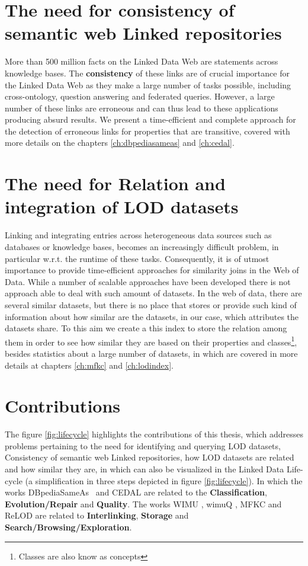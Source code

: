 \section{The need for consistency of semantic web Linked repositories}
More than 500 million facts on the Linked Data Web are statements across knowledge bases. The \textbf{consistency} of these links are of crucial importance for the Linked Data Web as they make a large number of tasks possible, including  cross-ontology, question answering and federated queries. However, a large number of these links are erroneous and can thus lead to these applications producing absurd results. We present a time-efficient and complete approach for the detection of erroneous links for properties that are transitive\cite{valdestilhasdbpediasameas, valdestilhas2017cedal}, covered with more details on the chapters \ref{ch:dbpediasameas} and \ref{ch:cedal}.

\section{The need for Relation and integration of LOD datasets}
Linking and integrating entries across heterogeneous data sources such as databases or knowledge bases, becomes an increasingly difficult problem, in particular w.r.t. the runtime of these tasks. Consequently, it is of utmost importance to provide time-efficient approaches for similarity joins in the Web of Data. While a number of scalable approaches have been developed there is not approach able to deal with such amount of datasets. In the web of data, there are several similar datasets, but there is no place that stores or provide such kind of information about how similar are the datasets, in our case, which attributes the datasets share. To this aim we create a this index\cite{valdestilhas2019ReLOD} to store the relation among them in order to see how similar they are based on their properties and classes\footnote{Classes are also know as concepts}, besides statistics about a large number of datasets, in which are covered in more details at chapters \ref{ch:mfkc} and \ref{ch:lodindex}.

\section{Contributions}
The figure \ref{fig:lifecycle} highlights the contributions of this thesis, which addresses
problems pertaining to the need for identifying and querying LOD datasets, Consistency of semantic web Linked repositories, how LOD datasets are related and how similar they are, in which can also be visualized in the Linked Data Life-cycle \cite{AUE+11} (a simplification in three steps depicted in figure \ref{fig:lifecycle}). In which the works DBpediaSameAs~\cite{valdestilhasdbpediasameas} and CEDAL \cite{valdestilhas2017cedal} are related to the \textbf{Classification}, \textbf{Evolution/Repair} and \textbf{Quality}. The works WIMU \cite{valdestilhas2018my}, wimuQ \cite{ValdestilhasKcap}, MFKC  \cite{valdestilhas2017high} and ReLOD \cite{valdestilhas2019ReLOD} are related to \textbf{Interlinking}, \textbf{Storage} and \textbf{Search/Browsing/Exploration}.

